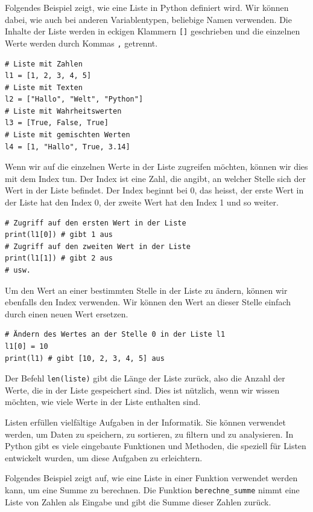 \begin{myexample}
Folgendes Beispiel zeigt, wie eine Liste in Python definiert wird. Wir können dabei, wie auch bei anderen Variablentypen, beliebige Namen verwenden. Die Inhalte der Liste werden in eckigen Klammern \lstinline|[]| geschrieben und die einzelnen Werte werden durch Kommas \lstinline|,| getrennt.
\begin{lstlisting}
# Liste mit Zahlen  
l1 = [1, 2, 3, 4, 5]
# Liste mit Texten
l2 = ["Hallo", "Welt", "Python"]
# Liste mit Wahrheitswerten
l3 = [True, False, True]
# Liste mit gemischten Werten
l4 = [1, "Hallo", True, 3.14]
\end{lstlisting}
\end{myexample}
\begin{myexample}
Wenn wir auf die einzelnen Werte in der Liste zugreifen möchten, können wir dies mit dem Index tun. Der Index ist eine Zahl, die angibt, an welcher Stelle sich der Wert in der Liste befindet. Der Index beginnt bei 0, das heisst, der erste Wert in der Liste hat den Index 0, der zweite Wert hat den Index 1 und so weiter.
\begin{lstlisting}
# Zugriff auf den ersten Wert in der Liste
print(l1[0]) # gibt 1 aus
# Zugriff auf den zweiten Wert in der Liste
print(l1[1]) # gibt 2 aus
# usw.
\end{lstlisting}
\end{myexample}
\begin{myexample}
Um den Wert an einer bestimmten Stelle in der Liste zu ändern, können wir ebenfalls den Index verwenden. Wir können den Wert an dieser Stelle einfach durch einen neuen Wert ersetzen.
\begin{lstlisting}
# Ändern des Wertes an der Stelle 0 in der Liste l1
l1[0] = 10
print(l1) # gibt [10, 2, 3, 4, 5] aus
\end{lstlisting}
\end{myexample}
\begin{myexample}
Der Befehl \lstinline|len(liste)| gibt die Länge der Liste zurück, also die Anzahl der Werte, die in der Liste gespeichert sind. Dies ist nützlich, wenn wir wissen möchten, wie viele Werte in der Liste enthalten sind.
\end{myexample}

Listen erfüllen vielfältige Aufgaben in der Informatik. Sie können verwendet werden, um Daten zu speichern, zu sortieren, zu filtern und zu analysieren. In Python gibt es viele eingebaute Funktionen und Methoden, die speziell für Listen entwickelt wurden, um diese Aufgaben zu erleichtern.
\begin{myexample}
Folgendes Beispiel zeigt auf, wie eine Liste in einer Funktion verwendet werden kann, um eine Summe zu berechnen. Die Funktion \lstinline|berechne_summe| nimmt eine Liste von Zahlen als Eingabe und gibt die Summe dieser Zahlen zurück.

\end{myexample}


